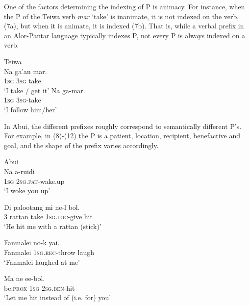 One of the factors determining the indexing of P is animacy. For instance, when the P of the Teiwa verb \textit{mar} `take' is inanimate, it is not indexed on the verb, (7a), but when it  is animate, it is indexed (7b). That is, while a verbal prefix in an Alor-Pantar language typically indexes P, not every P is always indexed on a verb.



\ea%
\label{ex:7}
 Teiwa \citep[91]{Klamer2010a}  \\
\gll Na  ga'an  mar. \\
  1\textsc{sg} 3\textsc{sg} take     \\
\glt `I take / get it'
\ex
\gll Na  ga-mar. \\
1\textsc{sg} 3\textsc{sg}{}-take  \\
\glt  `I follow him/her'
\z



In Abui, the different prefixes roughly correspond to semantically different P's. For example, in (8)-(12) the P is a patient, location, recipient, benefactive and goal, and the shape of the prefix varies accordingly.



\ea%
\label{ex:8}
 Abui \citep[592]{Kratochvil2007}   \\
\gll Na   a-ruidi  \\
 \textsc{1sg}   \textsc{2sg.pat}{}-wake.up  \\
\glt  `I woke you up'
\z






\ea%
\label{ex:9}
\gll Di   palootang   mi   ne-l     bol.  \\
 3   rattan     take   \textsc{1sg.loc-}give  hit  \\
\glt  `He hit me with a rattan (stick)'
\z

\textit{}





\ea%
\label{ex:10}
\gll Fanmalei   no-k       yai.  \\
Fanmalei   \textsc{1sg.rec-}throw   laugh   \\
\glt  `Fanmalei  laughed at me'
\z



\ea%
\label{ex:11}
\gll Ma     ne   ee-bol. \\
 be.\textsc{prox}   \textsc{1sg}   \textsc{2sg.ben}{}-hit  \\
\glt  `Let me hit instead of (i.e. for) you'
\z






